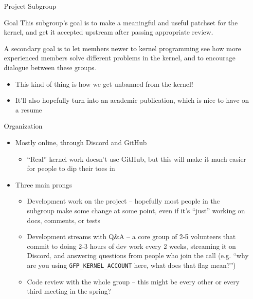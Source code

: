 \documentclass[aspectratio=169]{beamer}
\date{September 25, 2024}
\begin{document}
\begin{frame}{Project Subgroup}
	\pause
	\begin{block}{Goal}
		This subgroup's goal is to make a meaningful and useful patchset for the kernel, and get it accepted upstream after passing appropriate review.

		\vspace{1em}

		A secondary goal is to let members newer to kernel programming see how more experienced members solve different problems in the kernel, and to encourage dialogue between these groups.
	\end{block}
	\begin{itemize}
		\item This kind of thing is how we get unbanned from the kernel!
		\item It'll also hopefully turn into an academic publication, which is nice to have on a resume
	\end{itemize}
\end{frame}

\begin{frame}{Organization}
	\begin{itemize}
		\item<1-> Mostly online, through Discord and GitHub
			\begin{itemize}
				\item ``Real'' kernel work doesn't use GitHub, but this will make it much easier for people to dip their toes in
			\end{itemize}
		\item<2-> Three main prongs
			\begin{itemize}
				\item<2-> Development work on the project -- hopefully most people in the subgroup make some change at some point, even if it's ``just'' working on docs, comments, or tests
				\item<3-> Development streams with Q\&A -- a core group of 2-5 volunteers that commit to doing 2-3 hours of dev work every 2 weeks, streaming it on Discord, and answering questions from people who join the call (e.g. ``why are you using \texttt{GFP\_KERNEL\_ACCOUNT} here, what does that flag mean?'')
				\item<4-> Code review with the whole group -- this might be every other or every third meeting in the spring?
			\end{itemize}
	\end{itemize}
\end{frame}
\end{document}
